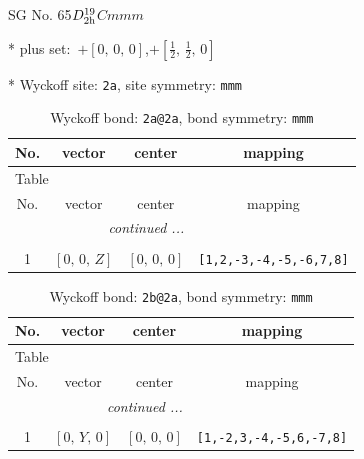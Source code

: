 \documentclass[fleqn,8pt]{jsarticle}
\begin{document}
\setcounter{MaxMatrixCols}{32}

\renewcommand{\tablename}{Table~}
\renewcommand{\figurename}{Figure~}
\begin{center}
\LARGE
SG No. 65\quad$D_{\rm 2h}^{19}$\quad$Cmmm$\quad[ orthorhombic ]
\end{center}

* plus set:\,\,\,$+\left[ 0,\, 0,\, 0 \right]$,\quad $+\left[ \frac{1}{2},\, \frac{1}{2},\, 0 \right]$


* Wyckoff site: {\tt 2a}, site symmetry: {\tt mmm}
\renewcommand{\arraystretch}{1.2}
\begin{longtable}{cccc}
\caption{Wyckoff bond: {\tt 2a@2a}, bond symmetry: {\tt mmm}}
 \\
 \hline \hline
No. & vector & center & mapping \\ \hline \endfirsthead

\multicolumn{3}{l}{\tablename\ \thetable{}} \\
 \hline \hline
No. & vector & center & mapping \\ \hline \endhead

 \hline \hline
\multicolumn{3}{r}{\footnotesize\it continued ...} \\ \endfoot

 \hline \hline
\multicolumn{3}{r}{} \\ \endlastfoot

1 & $\left[ 0,\, 0,\, Z \right]$ & $\left[ 0,\, 0,\, 0 \right]$ & {\tt [1,2,-3,-4,-5,-6,7,8]} \\
\end{longtable}
\renewcommand{\arraystretch}{1.2}
\begin{longtable}{cccc}
\caption{Wyckoff bond: {\tt 2b@2a}, bond symmetry: {\tt mmm}}
 \\
 \hline \hline
No. & vector & center & mapping \\ \hline \endfirsthead

\multicolumn{3}{l}{\tablename\ \thetable{}} \\
 \hline \hline
No. & vector & center & mapping \\ \hline \endhead

 \hline \hline
\multicolumn{3}{r}{\footnotesize\it continued ...} \\ \endfoot

 \hline \hline
\multicolumn{3}{r}{} \\ \endlastfoot

1 & $\left[ 0,\, Y,\, 0 \right]$ & $\left[ 0,\, 0,\, 0 \right]$ & {\tt [1,-2,3,-4,-5,6,-7,8]} \\
\end{longtable}
\end{document}
